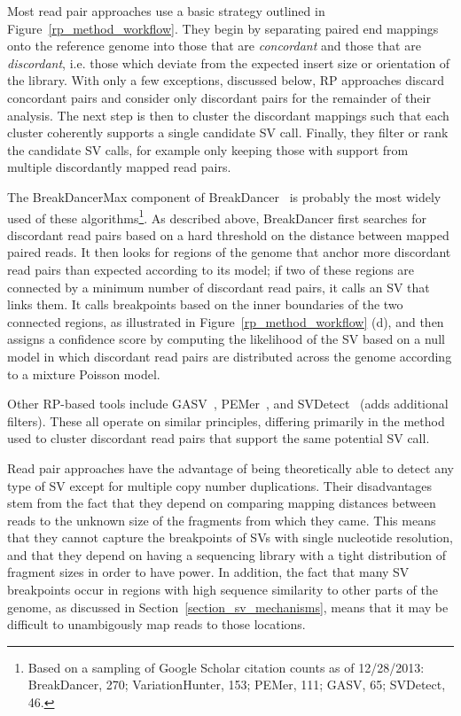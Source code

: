 Most read pair approaches use a basic strategy outlined in Figure~\ref{rp_method_workflow}. They begin by separating paired end mappings onto the reference genome into those that are \emph{concordant} and those that are \emph{discordant}, i.e. those which deviate from the expected insert size or orientation of the library. With only a few exceptions, discussed below, RP approaches discard concordant pairs and consider only discordant pairs for the remainder of their analysis. The next step is then to cluster the discordant mappings such that each cluster coherently supports a single candidate SV call. Finally, they filter or rank the candidate SV calls, for example only keeping those with support from multiple discordantly mapped read pairs. 

The BreakDancerMax component of BreakDancer~\cite{Chen:2009p3} is probably the most widely used of these algorithms\footnote{Based on a sampling of Google Scholar citation counts as of 12/28/2013: BreakDancer, 270; VariationHunter, 153; PEMer, 111; GASV, 65; SVDetect, 46.}. As described above, BreakDancer first searches for discordant read pairs based on a hard threshold on the distance between mapped paired reads. It then looks for regions of the genome that anchor more discordant read pairs than expected according to its model; if two of these regions are connected by a minimum number of discordant read pairs, it calls an SV that links them. It calls breakpoints based on the inner boundaries of the two connected regions, as illustrated in Figure~\ref{rp_method_workflow} (d), and then assigns a confidence score by computing the likelihood of the SV based on a null model in which discordant read pairs are distributed across the genome according to a mixture Poisson model.

Other RP-based tools include GASV~\cite{Sindi:2009gu}, PEMer~\cite{Korbel:2009dy}, and SVDetect~\cite{Zeitouni:2010p8} (adds additional filters). These all operate on similar principles, differing primarily in the method used to cluster discordant read pairs that support the same potential SV call. 

Read pair approaches have the advantage of being theoretically able to detect any type of SV except for multiple copy number duplications. Their disadvantages stem from the fact that they depend on comparing mapping distances between reads to the unknown size of the fragments from which they came. This means that they cannot capture the breakpoints of SVs with single nucleotide resolution, and that they depend on having a sequencing library with a tight distribution of fragment sizes in order to have power. In addition, the fact that many SV breakpoints occur in regions with high sequence similarity to other parts of the genome, as discussed in Section~\ref{section_sv_mechanisms}, means that it may be difficult to unambigously map reads to those locations.


